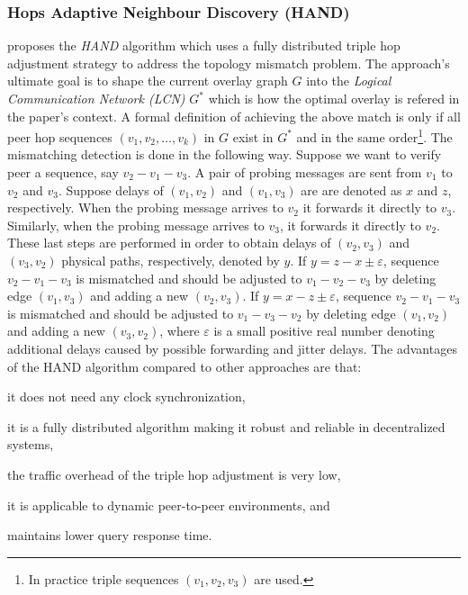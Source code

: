 \subsubsection{Hops Adaptive Neighbour Discovery (HAND)}
\cite{CLZHC2006} proposes the \emph{HAND} algorithm which uses a
fully distributed triple hop adjustment strategy to address the topology
mismatch problem. The approach's ultimate goal is to shape the current overlay
graph $G$ into the \emph{Logical Communication Network (LCN)} $G^{*}$ which is
how the optimal overlay is refered in the paper's context. A formal
definition of achieving the above match is only if all peer hop sequences $(v_1,
v_2, \ldots, v_k)$ in $G$ exist in $G^{*}$ and in the same order\footnote{In
practice triple sequences $(v_1, v_2, v_3)$ are used.}. The mismatching
detection is done in the following way. Suppose we want to verify peer a
sequence, say $v_2-v_1-v_3$. A pair of probing messages are sent from $v_1$ to
$v_2$ and $v_3$. Suppose delays of $(v_1,v_2)$ and $(v_1,v_3)$ are are denoted
as $x$ and $z$, respectively. When the probing message arrives to $v_2$ it
forwards it directly to $v_3$. Similarly, when the probing message arrives to
$v_3$, it forwards it directly to $v_2$. These last steps are performed in order
to obtain delays of $(v_2,v_3)$ and $(v_3,v_2)$ physical paths, respectively,
denoted by $y$. If $y=z-x\pm\varepsilon$, sequence $v_2-v_1-v_3$ is mismatched
and should be adjusted to $v_1-v_2-v_3$ by deleting edge $(v_1,v_3)$ and adding
a new $(v_2,v_3)$. If $y=x-z\pm\varepsilon$, sequence $v_2-v_1-v_3$ is
mismatched and should be adjusted to $v_1-v_3-v_2$ by deleting edge $(v_1,v_2)$
and adding a new $(v_3,v_2)$, where $\varepsilon$ is a small positive real
number denoting additional delays caused by possible forwarding and jitter
delays. The advantages of the HAND algorithm compared to other approaches are
that:
\begin{inparaenum}
  \item it does not need any clock synchronization,
  \item it is a fully distributed algorithm making it robust and reliable in
        decentralized systems,
  \item the traffic overhead of the triple hop adjustment is very low,
  \item it is applicable to dynamic peer-to-peer environments, and
  \item maintains lower query response time.
\end{inparaenum}

